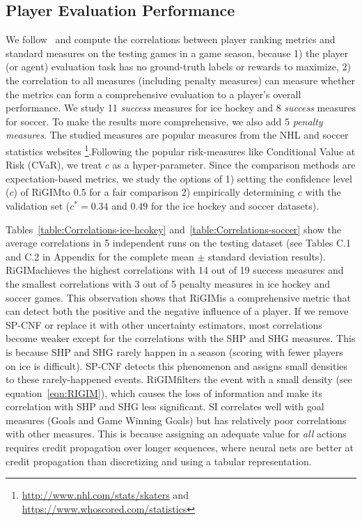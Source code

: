 \documentclass[letterpaper]{article} %
\newcommand{\confidence}{c}
\newcommand{\sys}{RiGIM}
\newcommand{\system}{\sys\;}
\begin{document}
\subsection{Player Evaluation Performance
}

We follow~\cite{Liu2018DRL} and compute the correlations between player ranking metrics and standard measures on the testing games in a game season, because 1) the player (or agent) evaluation task has no ground-truth labels or rewards to maximize, 2) the correlation to all measures (including penalty measures) can measure whether the metrics can form a comprehensive evaluation to a player's overall performance. We study 11 {\it success} measures for ice hockey and 8 {\it success} measures for soccer. To make the results more comprehensive, we also add 5 {\it penalty measures}. The studied measures
are popular measures from the NHL and soccer statistics websites \footnote{\url{http://www.nhl.com/stats/skaters} and \url{https://www.whoscored.com/statistics}}.Following the popular risk-measures like Conditional Value at Risk (CVaR), we treat $\confidence$ as a hyper-parameter.
Since the comparison methods are expectation-based metrics, we study the options of 1) setting the confidence level ($\confidence$) of \system to 0.5 for a fair comparison 2) empirically determining $\confidence$ with the validation set ($\confidence^{*}=0.34$ and $0.49$ for the ice hockey and soccer datasets). 

Tables~\ref{table:Correlations-ice-hcokey} and~\ref{table:Correlations-soccer} show the average correlations in 5 independent runs on the testing dataset (see Tables C.1 and C.2 in Appendix for the complete mean $\pm$ standard deviation results). \system achieves the highest correlations with 14 out of 19 success measures and the smallest correlations with 3 out of 5 penalty measures in ice hockey and soccer games. This observation shows that \system is a comprehensive metric that can detect both the positive and the negative influence of a player. If we remove SP-CNF or replace it with other uncertainty estimators, most correlations become weaker except for the correlations with the SHP and SHG measures. This is because SHP and SHG rarely happen in a season (scoring with fewer players on ice is difficult). SP-CNF detects this phenomenon and assigns small densities to these rarely-happened events. \system filters the event with a small density (see equation~\ref{eqn:RIGIM}), which causes the loss of information and make its correlation with SHP and SHG less significant.
SI correlates well with goal measures (Goals and Game Winning Goals) but has relatively poor correlations with other measures. This is because assigning an adequate value for {\em all} actions
requires credit propagation over longer sequences, where neural nets are better at credit propagation than discretizing and using a tabular representation. 
\end{document}
